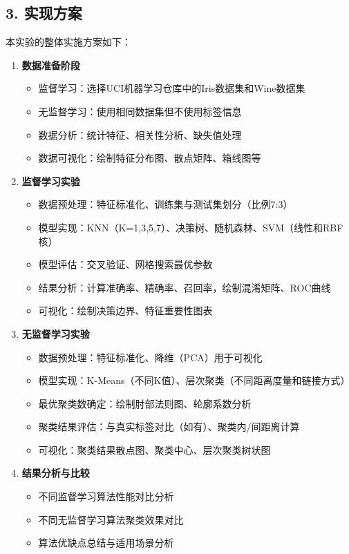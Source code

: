 \documentclass[UTF8]{ctexart}
\begin{document}
\subsection*{3. 实现方案}
本实验的整体实施方案如下：

\begin{enumerate}
  \item \textbf{数据准备阶段}
    \begin{itemize}
      \item 监督学习：选择UCI机器学习仓库中的Iris数据集和Wine数据集
      \item 无监督学习：使用相同数据集但不使用标签信息
      \item 数据分析：统计特征、相关性分析、缺失值处理
      \item 数据可视化：绘制特征分布图、散点矩阵、箱线图等
    \end{itemize}
  
  \item \textbf{监督学习实验}
    \begin{itemize}
      \item 数据预处理：特征标准化、训练集与测试集划分（比例7:3）
      \item 模型实现：KNN（K=1,3,5,7）、决策树、随机森林、SVM（线性和RBF核）
      \item 模型评估：交叉验证、网格搜索最优参数
      \item 结果分析：计算准确率、精确率、召回率，绘制混淆矩阵、ROC曲线
      \item 可视化：绘制决策边界、特征重要性图表
    \end{itemize}
  
  \item \textbf{无监督学习实验}
    \begin{itemize}
      \item 数据预处理：特征标准化、降维（PCA）用于可视化
      \item 模型实现：K-Means（不同K值）、层次聚类（不同距离度量和链接方式）
      \item 最优聚类数确定：绘制肘部法则图、轮廓系数分析
      \item 聚类结果评估：与真实标签对比（如有）、聚类内/间距离计算
      \item 可视化：聚类结果散点图、聚类中心、层次聚类树状图
    \end{itemize}
  
  \item \textbf{结果分析与比较}
    \begin{itemize}
      \item 不同监督学习算法性能对比分析
      \item 不同无监督学习算法聚类效果对比
      \item 算法优缺点总结与适用场景分析
    \end{itemize}
\end{enumerate}
\end{document}
